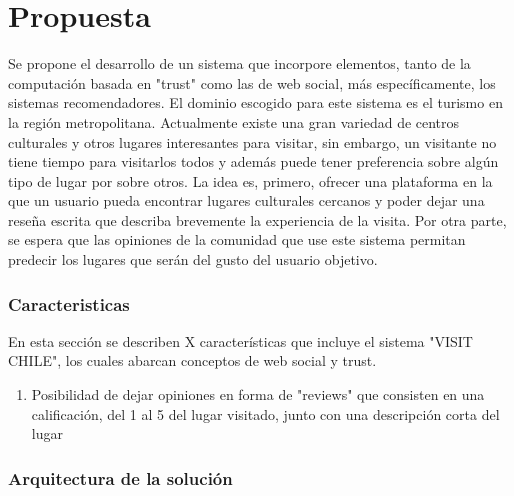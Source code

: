 \chapter{Propuesta}

Se propone el desarrollo de un sistema que incorpore elementos, tanto de la computación basada en "trust" como las de web social, más específicamente, los sistemas recomendadores. El dominio escogido para este sistema es el turismo en la región metropolitana. Actualmente existe una gran variedad de centros culturales y otros lugares interesantes para visitar, sin embargo, un visitante no tiene tiempo para visitarlos todos y además puede tener preferencia sobre algún tipo de lugar por sobre otros. La idea es, primero, ofrecer una plataforma en la que un usuario pueda encontrar lugares culturales cercanos y poder dejar una reseña escrita que describa brevemente la experiencia de la visita. Por otra parte, se espera que las opiniones de la comunidad que use este sistema permitan predecir los lugares que serán del gusto del usuario objetivo. 

\subsection{Caracteristicas}
En esta sección se describen X características que incluye el sistema "VISIT CHILE", los cuales abarcan conceptos de web social y trust.

\begin{enumerate}
\item{Posibilidad de dejar opiniones en forma de "reviews" que consisten en una calificación, del 1 al 5 del lugar visitado, junto con una descripción corta del lugar }
\end{enumerate}

\subsection{Arquitectura de la solución} 

